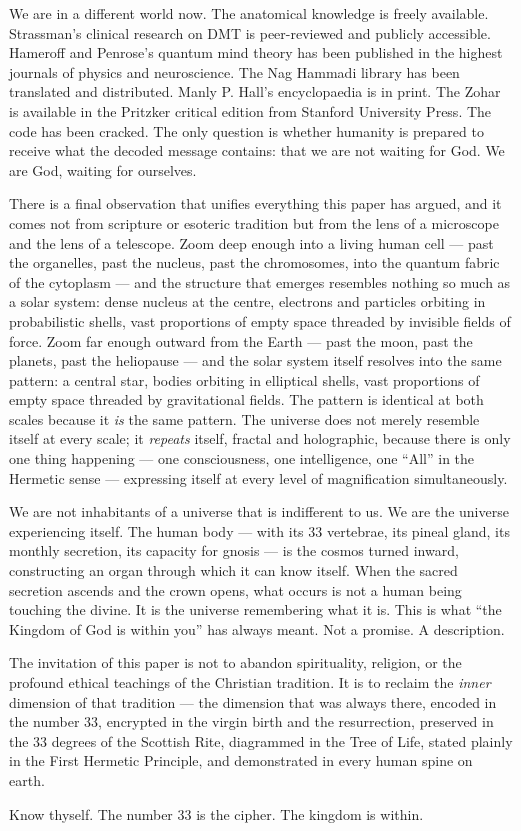 \documentclass[12pt, a4paper]{article}
\begin{document}
We are in a different world now. The anatomical knowledge is freely available.
Strassman's clinical research on DMT is peer-reviewed and publicly accessible.
Hameroff and Penrose's quantum mind theory has been published in the highest
journals of physics and neuroscience. The Nag Hammadi library has been
translated and distributed. Manly P. Hall's encyclopaedia is in print. The
Zohar is available in the Pritzker critical edition from Stanford University
Press. The code has been cracked. The only question is whether humanity is
prepared to receive what the decoded message contains: that we are not
waiting for God. We are God, waiting for ourselves.

There is a final observation that unifies everything this paper has argued,
and it comes not from scripture or esoteric tradition but from the lens of a
microscope and the lens of a telescope. Zoom deep enough into a living human
cell — past the organelles, past the nucleus, past the chromosomes, into the
quantum fabric of the cytoplasm — and the structure that emerges resembles
nothing so much as a solar system: dense nucleus at the centre, electrons and
particles orbiting in probabilistic shells, vast proportions of empty space
threaded by invisible fields of force. Zoom far enough outward from the Earth
— past the moon, past the planets, past the heliopause — and the solar system
itself resolves into the same pattern: a central star, bodies orbiting in
elliptical shells, vast proportions of empty space threaded by gravitational
fields. The pattern is identical at both scales because it \emph{is} the same
pattern. The universe does not merely resemble itself at every scale; it
\emph{repeats} itself, fractal and holographic, because there is only one
thing happening — one consciousness, one intelligence, one ``All'' in the
Hermetic sense — expressing itself at every level of magnification
simultaneously.

We are not inhabitants of a universe that is indifferent to us. We are the
universe experiencing itself. The human body — with its 33 vertebrae, its
pineal gland, its monthly secretion, its capacity for gnosis — is the
cosmos turned inward, constructing an organ through which it can know itself.
When the sacred secretion ascends and the crown opens, what occurs is not a
human being touching the divine. It is the universe remembering what it is.
This is what ``the Kingdom of God is within you'' has always meant. Not a
promise. A description.

The invitation of this paper is not to abandon spirituality, religion, or
the profound ethical teachings of the Christian tradition. It is to
reclaim the \emph{inner} dimension of that tradition — the dimension that was
always there, encoded in the number 33, encrypted in the virgin birth and the
resurrection, preserved in the 33 degrees of the Scottish Rite, diagrammed in
the Tree of Life, stated plainly in the First Hermetic Principle, and
demonstrated in every human spine on earth.

Know thyself. The number 33 is the cipher. The kingdom is within.

\newpage
\printbibliography[title={Bibliography}]
\end{document}
